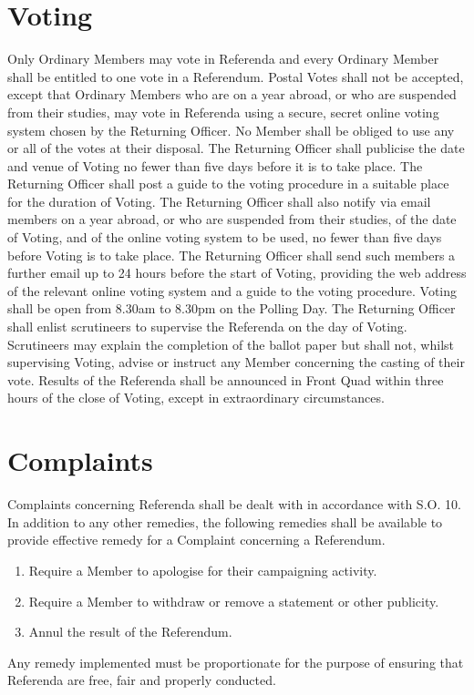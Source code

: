 \section{Voting}
\npara Only Ordinary Members may vote in Referenda and every Ordinary Member shall be entitled to one vote in a Referendum.
\npara Postal Votes shall not be accepted, except that Ordinary Members who are on a year abroad, or who are suspended from their studies, may vote in Referenda using a secure, secret online voting system chosen by the Returning Officer.
\npara No Member shall be obliged to use any or all of the votes at their disposal.
\npara The Returning Officer shall publicise the date and venue of Voting no fewer than five days before it is to take place. The Returning Officer shall post a guide to the voting procedure in a suitable place for the duration of Voting. The Returning Officer shall also notify via email members on a year abroad, or who are suspended from their studies, of the date of Voting, and of the online voting system to be used, no fewer than five days before Voting is to take place. The Returning Officer shall send such members a further email up to 24 hours before the start of Voting, providing the web address of the relevant online voting system and a guide to the voting procedure.
\npara Voting shall be open from 8.30am to 8.30pm on the Polling Day.
\npara The Returning Officer shall enlist scrutineers to supervise the Referenda on the day of Voting. Scrutineers may explain the completion of the ballot paper but shall not, whilst supervising Voting, advise or instruct any Member concerning the casting of their vote.
\npara Results of the Referenda shall be announced in Front Quad within three hours of the close of Voting, except in extraordinary circumstances.
\section{Complaints}
\npara Complaints concerning Referenda shall be dealt with in accordance with S.O. 10.
\npara In addition to any other remedies, the following remedies shall be available to provide effective remedy for a Complaint concerning a Referendum.
\begin{enumerate}
\item Require a Member to apologise for their campaigning activity.
\item Require a Member to withdraw or remove a statement or other publicity.
\item Annul the result of the Referendum.
\end{enumerate}

\npara Any remedy implemented must be proportionate for the purpose of ensuring that Referenda are free, fair and properly conducted.

